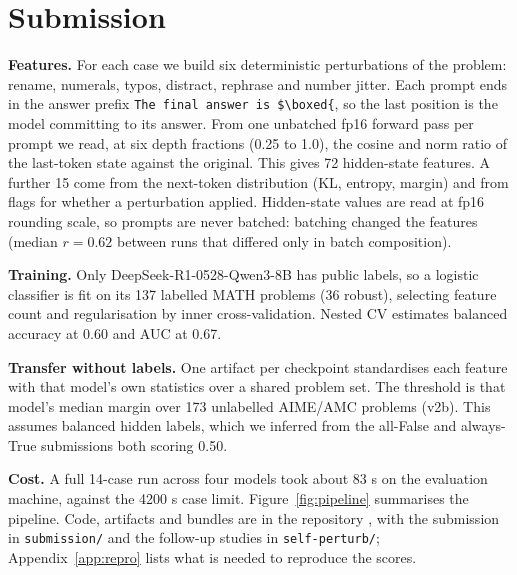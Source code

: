 \documentclass{article}
\begin{document}
\section{Submission}
\label{sec:method}

\textbf{Features.} For each case we build six deterministic perturbations of the problem: rename, numerals, typos, distract, rephrase and number jitter. Each prompt ends in the answer prefix \texttt{The final answer is \$\textbackslash boxed\{}, so the last position is the model committing to its answer. From one unbatched fp16 forward pass per prompt we read, at six depth fractions (0.25 to 1.0), the cosine and norm ratio of the last-token state against the original. This gives 72 hidden-state features. A further 15 come from the next-token distribution (KL, entropy, margin) and from flags for whether a perturbation applied. Hidden-state values are read at fp16 rounding scale, so prompts are never batched: batching changed the features (median $r=0.62$ between runs that differed only in batch composition).

\textbf{Training.} Only DeepSeek-R1-0528-Qwen3-8B has public labels, so a logistic classifier is fit on its 137 labelled MATH problems (36 robust), selecting feature count and regularisation by inner cross-validation. Nested CV estimates balanced accuracy at 0.60 and AUC at 0.67.

\textbf{Transfer without labels.} One artifact per checkpoint standardises each feature with that model's own statistics over a shared problem set. The threshold is that model's median margin over 173 unlabelled AIME/AMC problems (v2b). This assumes balanced hidden labels, which we inferred from the all-False and always-True submissions both scoring 0.50.

\textbf{Cost.} A full 14-case run across four models took about 83 s on the evaluation machine, against the 4200 s case limit. Figure~\ref{fig:pipeline} summarises the pipeline. Code, artifacts and bundles are in the repository \cite{repo}, with the submission in \texttt{submission/} and the follow-up studies in \texttt{self-perturb/}; Appendix~\ref{app:repro} lists what is needed to reproduce the scores.
\end{document}
